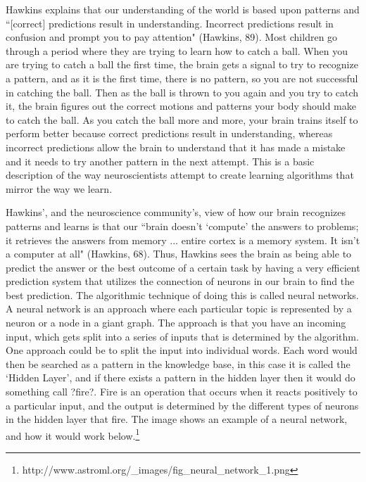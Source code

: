 \documentclass[11pt, oneside]{article}
\begin{document}
\par Hawkins explains that our understanding of the world is based upon patterns and ``[correct] predictions result in understanding. Incorrect predictions result in confusion and prompt you to pay attention" (Hawkins, 89). Most children go through a period where they are trying to learn how to catch a ball. When you are trying to catch a ball the first time, the brain gets a signal to try to recognize a pattern, and as it is the first time, there is no pattern, so you are not successful in catching the ball. Then as the ball is thrown to you again and you try to catch it, the brain figures out the correct motions and patterns your body should make to catch the ball. As you catch the ball more and more, your brain trains itself to perform better because correct predictions result in understanding, whereas incorrect predictions allow the brain to understand that it has made a mistake and it needs to try another pattern in the next attempt. This is a basic description of the way neuroscientists attempt to create learning algorithms that mirror the way we learn.

\par Hawkins', and the neuroscience community's, view of how our brain recognizes patterns and learns is that our ``brain doesn't `compute' the answers to problems; it retrieves the answers from memory ... entire cortex is a memory system. It isn't a computer at all" (Hawkins, 68). Thus, Hawkins sees the brain as being able to predict the answer or the best outcome of a certain task by having a very efficient prediction system that utilizes the connection of neurons in our brain to find the best prediction. The algorithmic technique of doing this is called neural networks. A neural network is an approach where each particular topic is represented by a neuron or a node in a giant graph. The approach is that you have an incoming input, which gets split into a series of inputs that is determined by the algorithm. One approach could be to split the input into individual words. Each word would then be searched as a pattern in the knowledge base, in this case it is called the `Hidden Layer', and if there exists a pattern in the hidden layer then it would do something call ?fire?. Fire is an operation that occurs when it reacts positively to a particular input, and the output is determined by the different types of neurons in the hidden layer that fire. The image shows an example of a neural network, and how it would work below.\footnote{http://www.astroml.org/\_images/fig\_neural\_network\_1.png}
\end{document}

